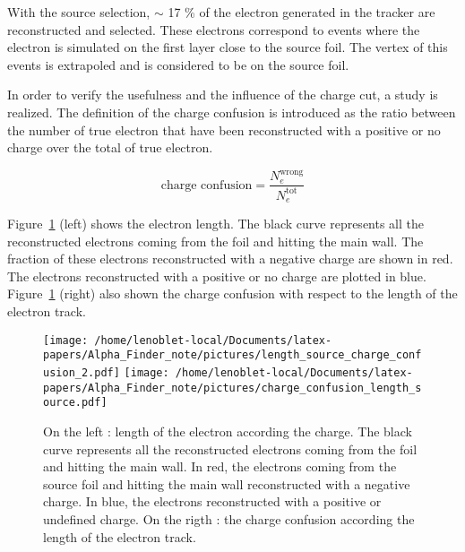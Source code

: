 \documentclass[main.tex]{subfiles}
\begin{document}
\bigskip


\noindent With the source selection, $\sim$ 17 \% of the electron generated in the tracker are reconstructed and selected. These electrons correspond to events where the electron is simulated on the first layer close to the source foil. The vertex of this events is extrapoled and is considered to be on the source foil.


\bigskip


\noindent In order to verify the usefulness and the influence of the charge cut, a study is realized. The definition of the charge confusion is introduced as the ratio between the number of true electron that have been reconstructed with a positive or no charge over the total of true electron.


\begin{equation}
\text{charge confusion} = \frac{N_e^{\text{wrong}}}{N_e^{\text{tot}}}
\end{equation}     


\bigskip


\noindent Figure~\ref{charge_confusion_source_plots} (left) shows the electron length. The black curve represents all the reconstructed electrons coming from the foil and hitting the main wall. The fraction of these electrons reconstructed with a negative charge are shown in red. The electrons reconstructed with a positive or no charge are plotted in blue. Figure~\ref{charge_confusion_source_plots} (right) also shown the charge confusion with respect to the length of the electron track. 

\bigskip


\begin{figure}[h!]
\begin{center}
\texttt{[image: /home/lenoblet-local/Documents/latex-papers/Alpha\_Finder\_note/pictures/length\_source\_charge\_confusion\_2.pdf]}
\texttt{[image: /home/lenoblet-local/Documents/latex-papers/Alpha\_Finder\_note/pictures/charge\_confusion\_length\_source.pdf]}
\caption{On the left : length of the electron according the charge. The black curve represents all the reconstructed electrons coming from the foil and hitting the main wall. In red, the electrons coming from the source foil and hitting the main wall reconstructed with a negative charge. In blue, the electrons reconstructed with a positive or undefined charge. On the rigth : the charge confusion according the length of the electron track.}
\label{charge_confusion_source_plots}
\end{center}
\end{figure}
\end{document}
